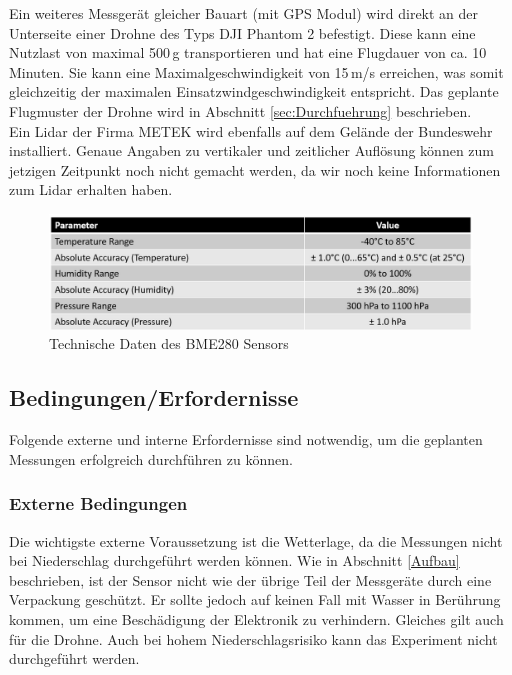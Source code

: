 \documentclass[a4paper,11pt,DIV=calc,tablecaptionabove,headinclude,twoside]{article}
\begin{document}
Ein weiteres Messgerät gleicher Bauart (mit GPS Modul) wird direkt an der Unterseite einer Drohne des Typs DJI Phantom 2 befestigt. Diese kann eine Nutzlast von maximal 500\,g transportieren und hat eine Flugdauer von ca. 10 Minuten. Sie kann eine Maximalgeschwindigkeit von 15\,m/s erreichen, was somit gleichzeitig der maximalen Einsatzwindgeschwindigkeit entspricht. Das geplante Flugmuster der Drohne wird in Abschnitt \ref{sec:Durchfuehrung} beschrieben. \\

Ein Lidar der Firma METEK wird ebenfalls auf dem Gelände der Bundeswehr installiert. Genaue Angaben zu vertikaler und zeitlicher Auflösung können zum jetzigen Zeitpunkt noch nicht gemacht werden, da wir noch keine Informationen zum Lidar erhalten haben.  


\begin{figure}
\centering
\includegraphics[width=\textwidth]{BME_280_technische_Daten.png}
\caption{Technische Daten des BME280 Sensors}
\label{BME_280}
\end{figure}

\subsection{Bedingungen/Erfordernisse}
\label{Bedingungen}

Folgende externe und interne Erfordernisse sind notwendig, um die geplanten Messungen erfolgreich durchführen zu können.

\subsubsection{Externe Bedingungen}

Die wichtigste externe Voraussetzung ist die Wetterlage, da die Messungen nicht bei Niederschlag durchgeführt werden können. Wie in Abschnitt \ref{Aufbau} beschrieben, ist der Sensor nicht wie der übrige Teil der Messgeräte durch eine Verpackung geschützt. Er sollte jedoch auf keinen Fall mit Wasser in Berührung kommen, um eine Beschädigung der Elektronik zu verhindern. Gleiches gilt auch für die Drohne. Auch bei hohem Niederschlagsrisiko kann das Experiment nicht durchgeführt werden. \\
\end{document}

